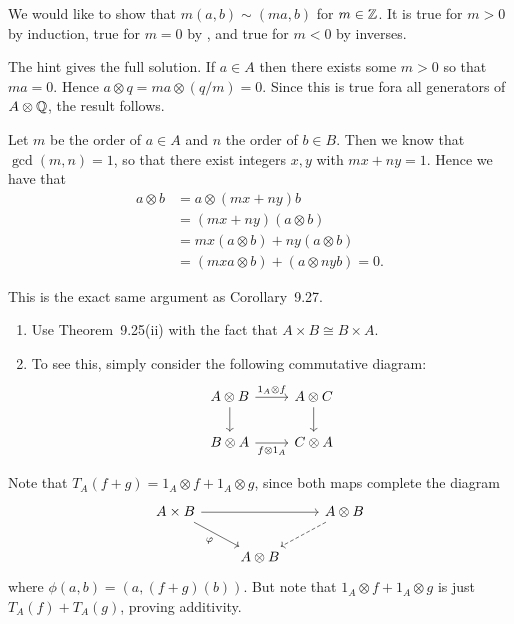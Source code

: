\documentclass[../../solutions.tex]{subfiles}
\begin{document}
\begin{exercise} \leavevmode
We would like to show that $m(a,b)\sim(ma,b)$ for $m\in\mathbb{Z}$.
It is true for $m>0$ by induction, true for $m=0$ by , and true for $m<0$ by inverses.
\end{exercise}

\begin{exercise} \leavevmode
The hint gives the full solution.
If $a\in A$ then there exists some $m>0$ so that $ma=0$.
Hence $a\otimes q=ma\otimes(q/m)=0$.
Since this is true fora all generators of $A\otimes\mathbb{Q}$, the result follows.
\end{exercise}

\begin{exercise} \leavevmode
Let $m$ be the order of $a\in A$ and $n$ the order of $b\in B$.
Then  we know that $\gcd(m,n)=1$, so that there exist integers $x,y$ with $mx+ny=1$.
Hence we have that
\begin{align*}
a\otimes b&=a\otimes(mx+ny)b\\
&=(mx+ny)(a\otimes b)\\
&=mx(a\otimes b)+ny(a\otimes b)\\
&=(mxa\otimes b)+(a\otimes nyb)=0.
\end{align*}
\end{exercise}

\begin{exercise} \leavevmode
This is the exact same argument as Corollary~9.27.
\end{exercise}

\begin{exercise} \leavevmode
\begin{enumerate}
\item
Use Theorem~9.25(ii) with the fact that $A\times B\cong B\times A$.

\item
To see this, simply consider the following commutative diagram:
\[
\begin{tikzcd}
A\otimes B\ar[d]\ar[r,"1_A\otimes f"] & A\otimes C\ar[d]\\
B\otimes A\ar[r,"f\otimes1_A",swap] & C\otimes A
\end{tikzcd}
\]
\end{enumerate}
\end{exercise}

\begin{exercise} \leavevmode
Note that $T_A(f+g)=1_A\otimes f+1_A\otimes g$, since both maps complete the diagram
\[
\begin{tikzcd}
A\times B\ar[dr,"\phi",swap]\ar[rr] & & A\otimes B\ar[dl,dashed] \\
& A\otimes B &
\end{tikzcd}
\]
where $\phi(a,b)=(a,(f+g)(b))$.
But note that $1_A\otimes f+1_A\otimes g$ is just $T_A(f)+T_A(g)$, proving additivity.
\end{exercise}
\end{document}
